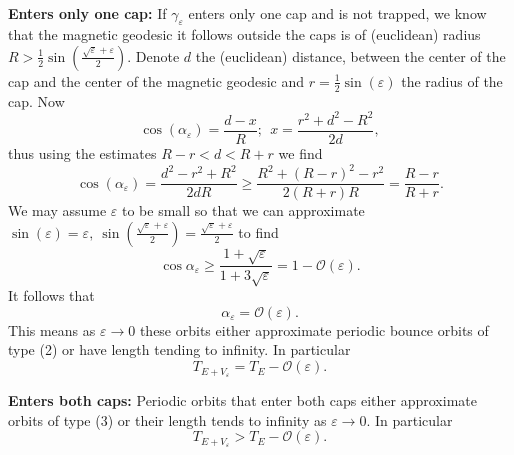 \documentclass[12pt]{article}
\begin{document}
\ \\
\noindent
\textbf{Enters only one cap:} If $\gamma_\varepsilon$ enters only one cap and is not trapped, we know that the magnetic geodesic it follows outside the caps is of (euclidean) radius $R>\frac{1}{2}\sin\left(\frac{\sqrt{\varepsilon}+\varepsilon}{2}\right)$. Denote $d$ the (euclidean) distance, between the center of the cap and the center of the magnetic geodesic and $r=\frac{1}{2}\sin(\varepsilon)$ the radius of the cap. Now 
$$
\cos(\alpha_\varepsilon)=\frac{d-x}{R};\ \ x=\frac{r^2+d^2-R^2}{2d},
$$
thus using the estimates $R-r<d<R+r$ we find 
$$
\cos (\alpha_\varepsilon)=\frac{d^2-r^2+R^2}{2dR}\geq\frac{R^2+(R-r)^2-r^2}{2(R+r)R}=\frac{R-r}{R+r}.
$$
We may assume $\varepsilon$ to be small so that we can approximate $\sin(\varepsilon)=\varepsilon,\ \sin\left (\frac{\sqrt\varepsilon+\varepsilon}{2}\right)=\frac{\sqrt\varepsilon+\varepsilon}{2}$ to find
$$
\cos{\alpha_\varepsilon}\geq \frac{1+\sqrt{\varepsilon}}{1+3\sqrt{\varepsilon}}=1-\mathcal{O}(\varepsilon).
$$
It follows that 
$$
\alpha_\varepsilon=\mathcal{O}(\varepsilon).
$$
This means as $\varepsilon\to 0$ these orbits either approximate periodic bounce orbits of type (2) or have length tending to infinity. In particular
$$
T_{E+V_\varepsilon}=T_E-\mathcal{O}(\varepsilon).
$$


\noindent
\textbf{Enters both caps:} Periodic orbits that enter both caps either approximate orbits of type (3) or their length tends to infinity as $\varepsilon\to 0$. In particular 
$$
T_{E+V_\varepsilon}>T_E-\mathcal{O}(\varepsilon).
$$
\end{document}

